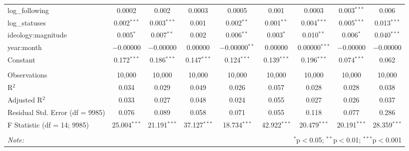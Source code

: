 \begin{table}[!htbp]
\begin{tabular}{@{\extracolsep{5pt}}lcccccccc}
  log\_following & 0.0002 & 0.002 & 0.0003 & 0.0005 & 0.001 & 0.0003 & 0.003$^{***}$ & 0.006 \\ 
  log\_statuses & 0.002$^{***}$ & 0.003$^{***}$ & 0.001 & 0.002$^{**}$ & 0.001$^{**}$ & 0.004$^{***}$ & 0.005$^{***}$ & 0.013$^{***}$ \\ 
  ideology:magnitude & 0.005$^{*}$ & 0.007$^{**}$ & 0.002 & 0.006$^{**}$ & 0.003$^{*}$ & 0.010$^{**}$ & 0.006$^{*}$ & 0.040$^{***}$ \\ 
  year:month & $-$0.00000 & $-$0.00000 & 0.00000 & $-$0.00000$^{**}$ & 0.00000 & 0.00000$^{***}$ & $-$0.00000 & $-$0.00000 \\ 
  Constant & 0.172$^{***}$ & 0.186$^{***}$ & 0.147$^{***}$ & 0.124$^{***}$ & 0.139$^{***}$ & 0.196$^{***}$ & 0.074$^{***}$ & 0.062 \\ 
 \hline \\[-1.8ex] 
Observations & 10,000 & 10,000 & 10,000 & 10,000 & 10,000 & 10,000 & 10,000 & 10,000 \\ 
R$^{2}$ & 0.034 & 0.029 & 0.049 & 0.026 & 0.057 & 0.028 & 0.028 & 0.038 \\ 
Adjusted R$^{2}$ & 0.033 & 0.027 & 0.048 & 0.024 & 0.055 & 0.027 & 0.026 & 0.037 \\ 
Residual Std. Error (df = 9985) & 0.076 & 0.089 & 0.058 & 0.071 & 0.055 & 0.118 & 0.077 & 0.286 \\ 
F Statistic (df = 14; 9985) & 25.004$^{***}$ & 21.191$^{***}$ & 37.127$^{***}$ & 18.734$^{***}$ & 42.922$^{***}$ & 20.479$^{***}$ & 20.191$^{***}$ & 28.359$^{***}$ \\ 
\hline 
\hline \\[-1.8ex] 
\textit{Note:}  & \multicolumn{8}{r}{$^{*}$p$<$0.05; $^{**}$p$<$0.01; $^{***}$p$<$0.001} \\ 
\end{tabular} 
\end{table} 
